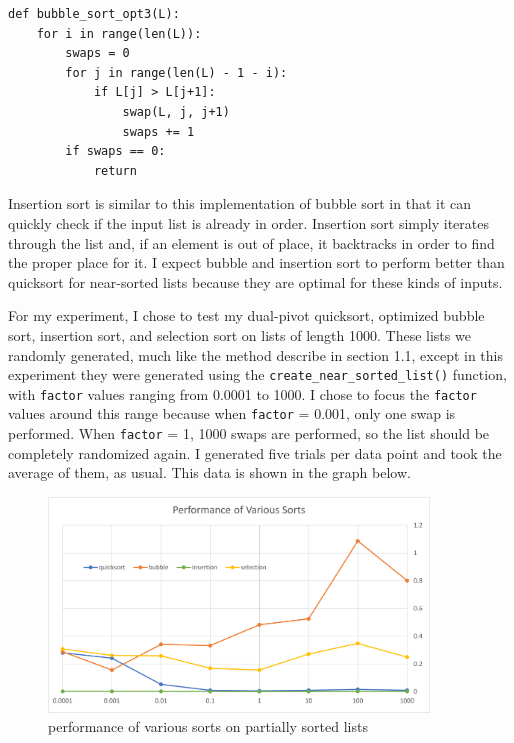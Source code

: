\documentclass[12pt]{article}
\begin{document}
\footnotesize
\begin{verbatim}
def bubble_sort_opt3(L):
    for i in range(len(L)):
        swaps = 0
        for j in range(len(L) - 1 - i):
            if L[j] > L[j+1]:
                swap(L, j, j+1)
                swaps += 1
        if swaps == 0:
            return
\end{verbatim}
\normalsize

\noindent Insertion sort is similar to this implementation of bubble sort in that it can quickly check if the input list is already in order. Insertion sort simply iterates through the list and, if an element is out of place, it backtracks in order to find the proper place for it. I expect bubble and insertion sort to perform better than quicksort for near-sorted lists because they are optimal for these kinds of inputs.

For my experiment, I chose to test my dual-pivot quicksort, optimized bubble sort, insertion sort, and selection sort on lists of length 1000. These lists we randomly generated, much like the method describe in section 1.1, except in this experiment they were generated using the \verb+create_near_sorted_list()+ function, with \verb+factor+ values ranging from 0.0001 to 1000. I chose to focus the \verb+factor+ values around this range because when \verb+factor+ = 0.001, only one swap is performed. When \verb+factor+ = 1, 1000 swaps are performed, so the list should be completely randomized again. I generated five trials per data point and took the average of them, as usual. This data is shown in the graph below.

\begin{figure}[H]
\centering
\includegraphics[width=0.9\textwidth,height=\textheight,keepaspectratio]{sorted_factor}
\caption{performance of various sorts on partially sorted lists}
\label{Figure: w2}
\end{figure}
\end{document}
